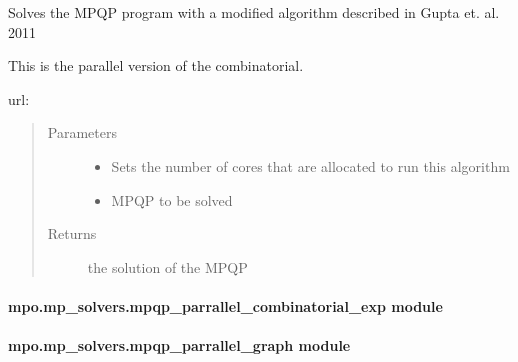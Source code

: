 \documentclass[letterpaper,10pt,english]{sphinxmanual}
\begin{document}
\begin{fulllineitems}
\label{\detokenize{mpo.mp_solvers:mpo.mp_solvers.mpqp_parrallel_combinatorial.solve}}
\sphinxAtStartPar
Solves the MPQP program with a modified algorithm described in Gupta et. al. 2011

\sphinxAtStartPar
This is the parallel version of the combinatorial.

\sphinxAtStartPar
url: 
\begin{quote}\begin{description}
\item[{Parameters}] \leavevmode\begin{itemize}
\item {} 
\sphinxAtStartPar
{} \textendash{} Sets the number of cores that are allocated to run this algorithm

\item {} 
\sphinxAtStartPar
{} \textendash{} MPQP to be solved

\end{itemize}

\item[{Returns}] \leavevmode
\sphinxAtStartPar
the solution of the MPQP

\end{description}\end{quote}

\end{fulllineitems}



\paragraph{mpo.mp\_solvers.mpqp\_parrallel\_combinatorial\_exp module}
\label{\detokenize{mpo.mp_solvers:mpo-mp-solvers-mpqp-parrallel-combinatorial-exp-module}}

\paragraph{mpo.mp\_solvers.mpqp\_parrallel\_graph module}
\label{\detokenize{mpo.mp_solvers:module-mpo.mp_solvers.mpqp_parrallel_graph}}\label{\detokenize{mpo.mp_solvers:mpo-mp-solvers-mpqp-parrallel-graph-module}}
\end{document}
